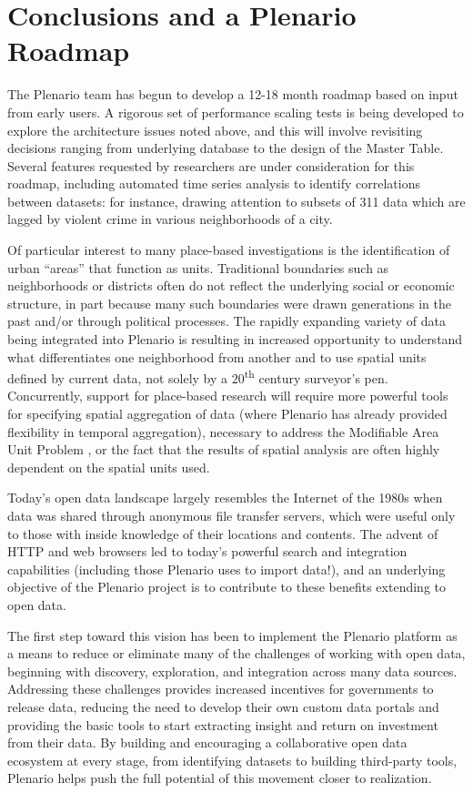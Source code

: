 \documentclass[11pt]{article}
\begin{document}
\section{Conclusions and a Plenario Roadmap}
The Plenario team has begun to develop a 12-18 month roadmap based on input from early users. A rigorous set of performance scaling tests is being developed to explore the architecture issues noted above, and this will involve revisiting decisions ranging from underlying database to the design of the Master Table. Several features requested by researchers are under consideration for this roadmap, including automated time series analysis to identify correlations between datasets: for instance, drawing attention to subsets of 311 data which are lagged by violent crime in various neighborhoods of a city. 

Of particular interest to many place-based investigations is the identification of urban ``areas'' that function as units. Traditional boundaries such as neighborhoods or districts often do not reflect the underlying social or economic structure, in part because many such boundaries were drawn generations in the past and/or through political processes. The rapidly expanding variety of data being integrated into Plenario is resulting in increased opportunity to understand what differentiates one neighborhood from another and to use spatial units defined by current data, not solely by a 20\textsuperscript{th} century surveyor's pen. Concurrently, support for place-based research will require more powerful tools for specifying spatial aggregation of data (where Plenario has already provided flexibility in temporal aggregation), necessary to address the Modifiable Area Unit Problem \cite{wong_2009}, or the fact that the results of spatial analysis are often highly dependent on the spatial units used.

Today's open data landscape largely resembles the Internet of the 1980s when data was shared through anonymous file transfer servers, which were useful only to those with inside knowledge of their locations and contents. The advent of HTTP and web browsers led to today's powerful search and integration capabilities (including those Plenario uses to import data!), and an underlying objective of the Plenario project is to contribute to these benefits extending to open data.

The first step toward this vision has been to implement the Plenario platform as a means to reduce or eliminate many of the challenges of working with open data, beginning with discovery, exploration, and integration across many data sources. Addressing these challenges provides increased incentives for governments to release data, reducing the need to develop their own custom data portals and providing the basic tools to start extracting insight and return on investment from their data. By building and encouraging a collaborative open data ecosystem at every stage, from identifying datasets to building third-party tools, Plenario helps push the full potential of this movement closer to realization. 
\end{document}
